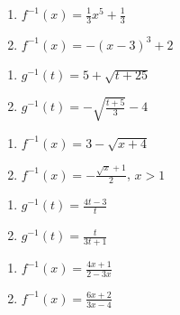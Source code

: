 \documentclass{ximera}
\begin{document}
\begin{multicols}{2}
\begin{enumerate}
\setcounter{enumi}{\value{HW}}

\item $f^{-1}(x) = \frac{1}{3} x^{5} + \frac{1}{3}$
\item $f^{-1}(x) = -(x-3)^3+2$

\setcounter{HW}{\value{enumi}}
\end{enumerate}
\end{multicols}

\begin{multicols}{2}
\begin{enumerate}
\setcounter{enumi}{\value{HW}}

\item $g^{-1}(t) = 5 + \sqrt{t+25}$
\item $g^{-1}(t) = -\sqrt{\frac{t + 5}{3}} - 4$

\setcounter{HW}{\value{enumi}}
\end{enumerate}
\end{multicols}

\begin{multicols}{2}
\begin{enumerate}
\setcounter{enumi}{\value{HW}}

\item $f^{-1}(x) = 3 - \sqrt{x+4}$

\item $f^{-1}(x) =-\frac{\sqrt{x}+1}{2}$, $x > 1$

\setcounter{HW}{\value{enumi}}
\end{enumerate}
\end{multicols}

\begin{multicols}{2}
\begin{enumerate}
\setcounter{enumi}{\value{HW}}

\item $g^{-1}(t) = \frac{4t-3}{t}$
\item $g^{-1}(t) = \frac{t}{3t+1}$

\setcounter{HW}{\value{enumi}}
\end{enumerate}
\end{multicols}

\begin{multicols}{2}
\begin{enumerate}
\setcounter{enumi}{\value{HW}}

\item $f^{-1}(x) = \frac{4x+1}{2-3x}$
\item $f^{-1}(x) = \frac{6x + 2}{3x - 4}$

\setcounter{HW}{\value{enumi}}
\end{enumerate}
\end{multicols}
\end{document}
